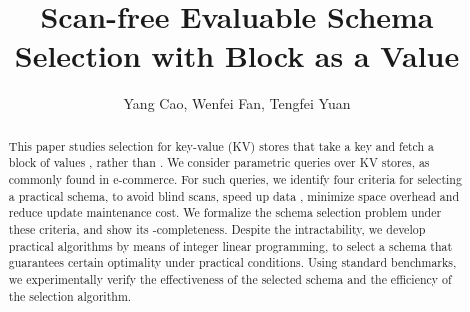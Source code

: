 \documentclass[sigconf]{acmart}
\title{{Scan-free Evaluable Schema Selection with Block as a Value}}
\author{Yang Cao, Wenfei Fan, Tengfei Yuan}
\affiliation{%
  \institution{
    University of Edinburgh
}}
\begin{document}
\date{}

\begin{abstract}
  This paper studies  selection for key-value (KV) stores
  that take a key and fetch a block of values , rather
  than .
  We consider parametric \SQL queries over KV
  stores, as commonly found in e-commerce. For such queries,
  we identify four criteria for selecting a practical schema,
  to avoid blind scans, speed up data , 
  minimize space overhead and reduce %
  update maintenance cost.
  We formalize the schema selection problem under these criteria,
  and show its \NP-completeness. Despite the intractability, 
  we develop practical algorithms by means of integer linear programming,
  to select a schema that guarantees
  certain optimality under practical conditions.
  Using standard %
  benchmarks,
  we experimentally verify the
  effectiveness of the selected schema and the efficiency of the
  selection algorithm.
\end{abstract}

\maketitle









\newpage



\end{document}
